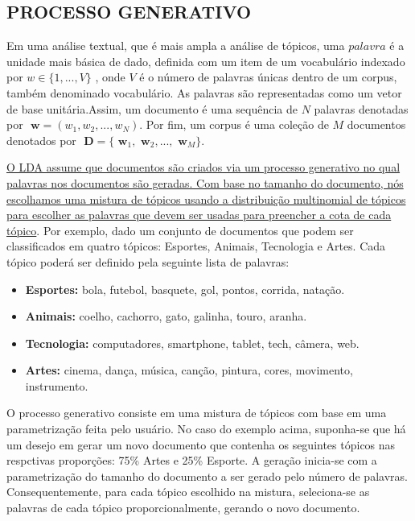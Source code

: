 \documentclass[12pt,a4paper]{article}
\begin{document}


\subsection{PROCESSO GENERATIVO}

Em uma análise textual, que é mais ampla a análise de  tópicos, uma $palavra$ é a unidade mais básica de dado, definida com um item de um vocabulário indexado por \(w \in \{1,. . . , V\}\)  , onde $V$ é o número de palavras únicas dentro de um corpus, também denominado vocabulário. As palavras são representadas como um vetor de base unitária.Assim, um documento é uma sequência de $N$ palavras denotadas por \(\textbf{ w} = (w_1, w_2,. . . ,  w_N)\). Por fim, um corpus é uma coleção de $M$ documentos denotados por \(\textbf{ D} = \{\textbf{ w}_1, \textbf{ w}_2, . . ., \textbf{ w}_M\}\).

\underline{O LDA assume que documentos são criados via um processo generativo no qual palavras nos documentos são geradas. Com base no tamanho do documento,
 nós escolhamos uma mistura de tópicos usando a distribuição multinomial de tópicos para escolher as palavras que devem ser usadas para preencher a cota de cada tópico}. Por exemplo, dado um conjunto de documentos que podem ser classificados em quatro tópicos: Esportes, Animais, Tecnologia e Artes. Cada tópico poderá ser definido pela seguinte lista de palavras:

\begin{itemize}
  \item \textbf{ Esportes:} bola, futebol, basquete, gol, pontos, corrida, natação.
  \item \textbf{ Animais:} coelho, cachorro, gato, galinha, touro, aranha.
  \item \textbf{ Tecnologia:} computadores, smartphone, tablet, tech, câmera, web.
  \item \textbf{ Artes:} cinema, dança, música, canção, pintura, cores, movimento, instrumento.
\end{itemize}

O processo generativo consiste em uma mistura de tópicos com base em uma parametrização feita pelo usuário. No caso do exemplo acima, suponha-se que há um desejo em gerar um novo documento que contenha os seguintes tópicos nas respctivas proporções: 75\% Artes e 25\% Esporte. A geração inicia-se com a parametrização do tamanho do documento a ser gerado pelo número de palavras. Consequentemente, para cada tópico escolhido na mistura, seleciona-se as palavras de cada tópico proporcionalmente, gerando o novo documento.
\end{document}
